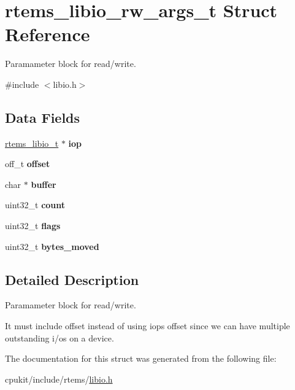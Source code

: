 \hypertarget{structrtems__libio__rw__args__t}{}\section{rtems\+\_\+libio\+\_\+rw\+\_\+args\+\_\+t Struct Reference}
\label{structrtems__libio__rw__args__t}


Paramameter block for read/write.  




{\ttfamily \#include $<$libio.\+h$>$}

\subsection*{Data Fields}
\begin{DoxyCompactItemize}
\item 
\mbox{\label{structrtems__libio__rw__args__t_a24119ed6162639b99d584c93dd26358e}} 
\mbox{\hyperlink{structrtems__libio__tt}{rtems\+\_\+libio\+\_\+t}} $\ast$ {\bfseries iop}
\item 
\mbox{\label{structrtems__libio__rw__args__t_a7efb03549135cc9082404961f53543af}} 
off\+\_\+t {\bfseries offset}
\item 
\mbox{\label{structrtems__libio__rw__args__t_a23c550d1e7c452a49296e1fe69b7e31f}} 
char $\ast$ {\bfseries buffer}
\item 
\mbox{\label{structrtems__libio__rw__args__t_a021c30bef7ed3643fab4713d3bfa7771}} 
uint32\+\_\+t {\bfseries count}
\item 
\mbox{\label{structrtems__libio__rw__args__t_aafc2bd3c498b858987ff9f3d5d131264}} 
uint32\+\_\+t {\bfseries flags}
\item 
\mbox{\label{structrtems__libio__rw__args__t_a1d7fedde8dc2ed2cfed3398b25adc5dc}} 
uint32\+\_\+t {\bfseries bytes\+\_\+moved}
\end{DoxyCompactItemize}


\subsection{Detailed Description}
Paramameter block for read/write. 

It must include \textquotesingle{}offset\textquotesingle{} instead of using iop\textquotesingle{}s offset since we can have multiple outstanding i/o\textquotesingle{}s on a device. 

The documentation for this struct was generated from the following file\+:\begin{DoxyCompactItemize}
\item 
cpukit/include/rtems/\mbox{\hyperlink{libio_8h}{libio.\+h}}\end{DoxyCompactItemize}

